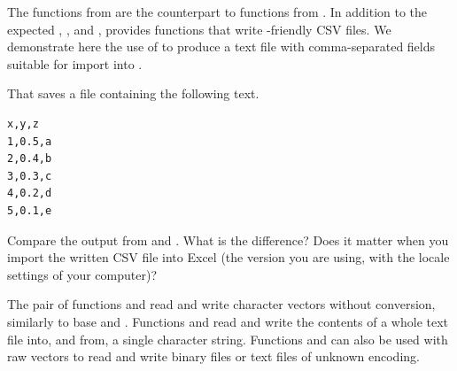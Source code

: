 \documentclass[krantz2]{krantz}\usepackage{knitr}
\begin{document}
The  functions from  are the counterpart to  functions from . In addition to the expected , ,  and ,  provides functions that write -friendly CSV files. We demonstrate here the use of  to produce a text file with comma-separated fields suitable for import into .

\begin{knitrout}\footnotesize
{}\color{fgcolor}\begin{kframe}
\begin{alltt}
  \hlstd{=} \hlstd{)}
\hlstd{(}\hlstd{,}  \hlstd{=} \hlstd{)}
\end{alltt}
\end{kframe}
\end{knitrout}

That saves a file containing the following text.
\begin{knitrout}\footnotesize
{}\color{fgcolor}\begin{kframe}
\begin{verbatim}
x,y,z
1,0.5,a
2,0.4,b
3,0.3,c
4,0.2,d
5,0.1,e
\end{verbatim}
\end{kframe}
\end{knitrout}

\begin{playground}
Compare the output from  and . What is the difference? Does it matter when you import the written CSV file into Excel (the version you are using, with the locale settings of your computer)?
\end{playground}

The pair of functions  and  read and write character vectors without conversion, similarly to base \Rlang {} and . Functions  and  read and write the contents of a whole text file into, and from, a single character string. Functions  and  can also be used with raw vectors to read and write binary files or text files of unknown encoding.
\end{document}
